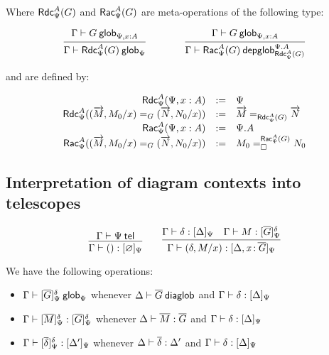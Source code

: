 Where $\fsttelglob{\Psi}{A}{G}$ and $\sndtelglob{\Psi}{A}{G}$ are
meta-operations of the following type:

\begin{small}
  \[
  \infer{\wfglob{\Gamma}{\fsttelglob{\Psi}{A}{G}}{\Psi}}
  {\wfglob{\Gamma}{G}{\Psi,x:A}}
  \qquad\qquad
  \infer{\wfdepglob{\Gamma}{\sndtelglob{\Psi}{A}{G}}{\Psi.A}
    {\fsttelglob{\Psi}{A}{G}}}
  {\wfglob{\Gamma}{G}{\Psi,x:A}}\]
\end{small}

and are defined by:

\begin{small}
  \[
  \begin{array}{rcl}
    \fsttelglob{\Psi}{A}{\Psi,x:A} & := & \Psi \\
    \fsttelglob{\Psi}{A}{\homj{G}{(\tel{M},M_0/x)}{(\tel{N},N_0/x)}} & := &
    \homj{\fsttelglob{\Psi}{A}{G}}{\tel{M}}{\tel{N}} \\
    \sndtelglob{\Psi}{A}{\Psi,x:A} & := & \Psi.A \\
    \sndtelglob{\Psi}{A}{\homj{G}{(\tel{M},M_0/x)}{(\tel{N},N_0/x)}} & := &
    \dhomj{\sndtelglob{\Psi}{A}{G}}{M_0}{N_0}{\blank}
    \\
  \end{array}
  \]
\end{small}

\subsection{Interpretation of diagram contexts into telescopes}

\begin{small}
\[\infer
    {\ofinterp{\Gamma}{()}{\emptyctx}{\Psi}}
    {\wftel{\Gamma}{\Psi}}
  \qquad
  \infer
    {\ofinterp{\Gamma}{(\delta,M/x)}{\Delta,\tptm{x}{\diag G}}{\Psi}}
    {\ofinterp{\Gamma}{\delta}{\Delta}{\Psi}
    &\ofglob{\Gamma}{M}{\interpglob{\diag G}{\Psi}{\delta}}}
\]
\end{small}

We have the following operations:
\begin{itemize}
\item $\wfglob{\Gamma}{\interpglob{\diag G}{\Psi}{\delta}}{\Psi}$ whenever
  $\wfdiaglob{\Delta}{\diag G}$ and $\ofinterp{\Gamma}{\delta}{\Delta}{\Psi}$
\item $\ofglob{\Gamma}{\interpglob{\diag M}{\Psi}{\delta}}{} {\interpglob{\diag
      G}{\Psi}{\delta}}$ whenever $\ofdiaglob{\Delta}{\diag M}{\diag G}$ and
  $\ofinterp{\Gamma}{\delta}{\Delta}{\Psi}$
\item $\ofinterp{\Gamma}{\interpglob{\diag\delta}{\Psi}{\delta}}{\Delta'}{\Psi}$
  whenever $\ofdiaglob{\Delta}{\diag\delta}{\Delta'}$ and
  $\ofinterp{\Gamma}{\delta}{\Delta}{\Psi}$
\end{itemize}


